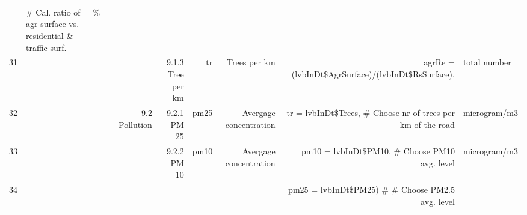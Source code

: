 \begin{landscape}
\begin{table}[ht]
{\begin{tabular}{rlrrrrrrr}
 & \# Cal. ratio of agr surface vs. residential \& traffic surf. & \% \\ 
  31 &  &  &  &  & 9.1.3 Tree per km & tr & Trees per km  & agrRe = (lvbInDt\$AgrSurface)/(lvbInDt\$RsSurface), & total number \\ 
  32 &  &  &  & 9.2 Pollution  & 9.2.1 PM 25 & pm25 & Avergage concentration & tr    = lvbInDt\$Trees, \# Choose nr of trees per km of the road & microgram/m3 \\ 
  33 &  &  &  &  & 9.2.2 PM 10 & pm10 & Avergage concentration & pm10  = lvbInDt\$PM10,  \# Choose PM10 avg. level & microgram/m3 \\ 
  34 &  &  &  &  &  &  &  & pm25  = lvbInDt\$PM25)  \# \# Choose PM2.5 avg. level &  \\ 
     \hline
\end{tabular}}
 
\end{table} 
  
\end{landscape}